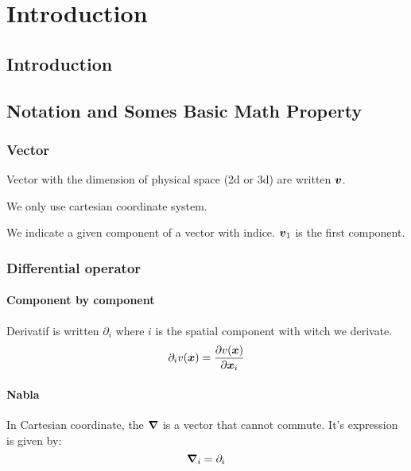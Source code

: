 \chapter{Introduction}

\section{Introduction}

\section{Notation and Somes Basic Math Property}

\subsection{Vector}

Vector with the dimension of physical space (2d or 3d) are written ${\boldsymbol {v}}$.

We only use cartesian coordinate system.

We indicate a given component of a vector with indice. ${\boldsymbol {v}}_1$ is the first component.

\subsection{Differential operator}

\subsubsection{Component by component}

Derivatif is written $\partial_i$ where $i$ is the spatial component with witch we derivate.
\begin{equation}
 \partial_i v({\boldsymbol {x}})=\frac{\partial v({\boldsymbol {x}})}{\partial {\boldsymbol {x}}_{i}}
\end{equation}

\subsubsection{Nabla}

\begin{definition}
 In Cartesian coordinate, the ${\boldsymbol {\nabla}}$ is a vector that cannot commute.
 It's expression is given by:
 \begin{equation}
 {\boldsymbol {\nabla}}_{i}=\partial_{i}
 \end{equation}
\end{definition}

